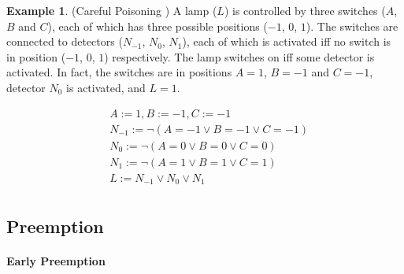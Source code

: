 \documentclass[11pt,a4paper]{book}
\theoremstyle{definition}
\theoremstyle{definition}
\newtheorem{example}{Example}[section]
\theoremstyle{definition}
\theoremstyle{remark}
\begin{document}
\begin{example}(Careful Poisoning \cite{Weslake2015partialtheory})
A lamp ($L$) is controlled by three switches ($A$, $B$ and $C$), each of which has three possible positions ($-1$, $0$, $1$). The switches are connected to detectors ($N_{-1}$, $N_0$, $N_1$), each of which is activated iff no switch is in position ($-1$, $0$, $1$) respectively. The lamp switches on iff some detector is activated. In fact, the switches are in positions $A=1$, $B=-1$ and $C=-1$, detector $N_0$ is activated, and $L=1$.


\begin{equation*}
\begin{split}
&A:=1, B:=-1, C:=-1\\
&N_{-1}:=\neg (A=-1 \lor B=-1 \lor C=-1) \\
&N_{0}:=\neg (A=0 \lor B=0 \lor C=0) \\
&N_{1}:=\neg (A=1 \lor B=1 \lor C=1) \\
&L:= N_{-1} \lor N_0 \lor N_1 \\
\end{split}
\end{equation*}
\begin{center}
\end{center}
\end{example}





\subsection{Preemption }

\paragraph*{Early Preemption}
\end{document}
